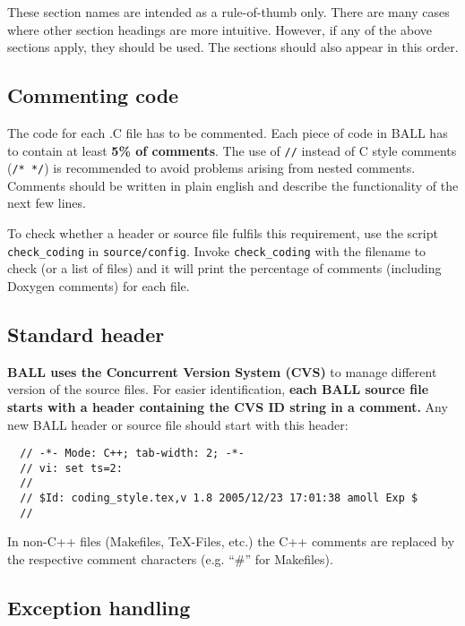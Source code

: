 \documentclass[a4paper,10pt]{article}
\begin{document}
These section names are intended as a rule-of-thumb only. There are many cases
where other section headings are more intuitive. However, if any of the above
sections apply, they should be used. The sections should also appear in this
order.

\subsection{Commenting code}

The code for each .C file has to be commented. Each piece of code in BALL has
to contain at least {\bf 5\% of comments}. The use of {\tt //} instead of C style
comments ({\tt /* */}) is recommended to avoid problems arising from nested
comments. Comments should be written in plain english and describe the
functionality of the next few lines.

To check whether a header or source file fulfils this requirement, use the
script {\tt check\_coding} in {\tt source/config}. Invoke {\tt check\_coding} with the
filename to check (or a list of files) and it will print the percentage of
comments (including Doxygen comments) for each file.

\subsection{Standard header}
                                                                                                                                                             
{\bf BALL uses the Concurrent Version System (CVS)} to manage different
version of the
source files. For easier identification, {\bf each BALL source file starts
with a header containing the CVS ID string in a comment.} Any new BALL header
or source file should start with this header:
\begin{verbatim}
  // -*- Mode: C++; tab-width: 2; -*-
  // vi: set ts=2:
  //
  // $Id: coding_style.tex,v 1.8 2005/12/23 17:01:38 amoll Exp $
  //                                                                                                                                                             
\end{verbatim}
In non-C++ files (Makefiles, TeX-Files, etc.) the C++ comments are replaced
by the respective comment characters (e.g. ``\#'' for Makefiles).

\subsection{Exception handling}
\end{document}
